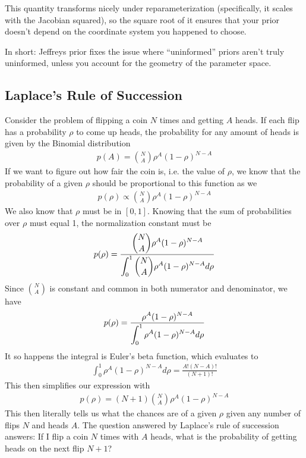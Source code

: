 This quantity transforms nicely under reparameterization (specifically, it scales with the Jacobian squared), so the square root of it ensures that your prior doesn’t depend on the coordinate system you happened to choose.

In short: Jeffreys prior fixes the issue where “uninformed” priors aren’t truly uninformed, unless you account for the geometry of the parameter space.

\subsection{Laplace's Rule of Succession}
Consider the problem of flipping a coin $N$ times and getting $A$ heads. If each flip has a probability $\rho$ to come up heads, the probability for any amount of heads is given by the Binomial distribution
\begin{align}
p(A) = \binom{N}{A}\rho^A(1-\rho)^{N-A}
\end{align}
If we want to figure out how fair the coin is, i.e. the value of $\rho$, we know that the probability of a given $\rho$ should be proportional to this function as we
\begin{align}
	p(\rho) \propto \binom{N}{A}\rho^A(1-\rho)^{N-A}
\end{align}
We also know that $\rho$ must be in $[0,1]$. Knowing that the sum of probabilities over $\rho$ must equal 1, the normalization constant must be
\begin{align}
	p(\rho) =\frac{\displaystyle  \binom{N}{A}\rho^A(1-\rho)^{N-A}}{\displaystyle \int_0^1\binom{N}{A}\rho^A(1-\rho)^{N-A} d\rho}
\end{align}
Since $\binom{N}{A}$ is constant and common in both numerator and denominator, we have
\begin{align}
	p(\rho) =\frac{\displaystyle  \rho^A(1-\rho)^{N-A}}{\displaystyle \int_0^1\rho^A(1-\rho)^{N-A} d\rho}
\end{align}
It so happens the integral is Euler's beta function, which evaluates to 
\begin{align}
	\int_0^1\rho^A(1-\rho)^{N-A} d\rho = \frac{A!(N-A)!}{(N+1)!}
\end{align}
This then simplifies our expression with
\begin{align}
	p(\rho) =(N+1)\binom{N}{A}\rho^A(1-\rho)^{N-A}
\end{align}
This then literally tells us what the chances are of a given $\rho$ given any number of flips $N$ and heads $A$. The question answered by Laplace's rule of succession answers: If I flip a coin $N$ times with $A$ heads, what is the probability of getting heads on the next flip $N+1$?

